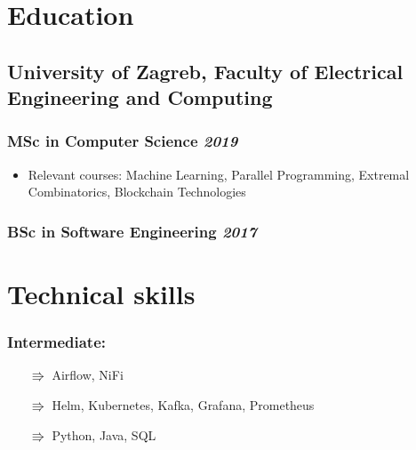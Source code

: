 \documentclass[a4paper]{article}
\newcommand{\bolditalicpair}
[2]
{\textbf{#1} \texorpdfstring{\hfill}{} \textit{#2}}
\begin{document}



\section{Education}
\subsection{\bolditalicpair{University of Zagreb, Faculty of Electrical Engineering and Computing}{}}

\subsubsection{\bolditalicpair{MSc in Computer Science}{2019}}

\begin{itemize}
  \item Relevant courses: Machine Learning, Parallel Programming, Extremal Combinatorics, Blockchain Technologies %
\end{itemize}

\subsubsection{\bolditalicpair{BSc in Software Engineering}{2017}}



\section{Technical skills}
\subsubsection{\bolditalicpair{Intermediate:}{}}

\begin{itemize}
  \item[$\Rrightarrow$] Airflow, NiFi
  \item[$\Rrightarrow$] Helm, Kubernetes, Kafka, Grafana, Prometheus
  \item[$\Rrightarrow$] Python, Java, SQL
\end{itemize}
\end{document}
